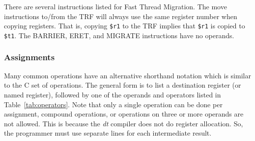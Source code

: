 There are several instructions listed for Fast Thread Migration.  The
move instructions to/from the TRF will always use the same register 
number when copying registers.  That is, copying \texttt{\$r1} to
the TRF implies that \texttt{\$r1} is copied to \texttt{\$t1}.  The
BARRIER, ERET, and MIGRATE instructions have no operands.

\subsubsection{Assignments\label{sec:assign}}

Many common operations have an alternative shorthand notation 
which is similar to the C set of operations.  The general form 
is to list a destination register (or named register), followed 
by one of the operands and operators listed in Table~\ref{tab:operators}.
Note that only a single operation can be done per assignment,
compound operations, or operations on three or more operands
are not allowed.  This is because the \emph{dt} compiler
does not do register allocation.  So, the programmer
must use separate lines for each intermediate result.

